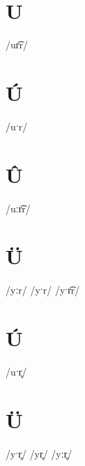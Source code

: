 \documentclass[10pt,a4paper,twoside]{book}
\begin{document}
\section*{U}

\begin{multicols}{3}
 {/ur͡r/} {}
\end{multicols}

\section*{Ú}

\begin{multicols}{3}
 {/uˑr/} {}
\end{multicols}

\section*{Û}

\begin{multicols}{3}
 {/uːr͡r/} {}
\end{multicols}

\section*{Ü}

\begin{multicols}{3}
 {/yːr/} {}
 {/yˑr/} {}
 {/yˑr͡r/} {}
\end{multicols}

\section*{Ú}

\begin{multicols}{3}
 {/uˑr̥/} {}
\end{multicols}

\section*{Ü}

\begin{multicols}{3}
 {/yˑr̥/} {}
 {/yr̥/} {}
 {/yːr̥/} {}
\end{multicols}
\end{document}
